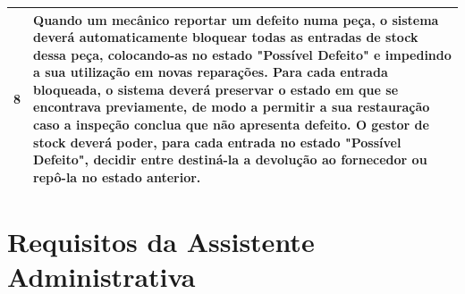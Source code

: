\documentclass[11pt,a4paper]{article}
\begin{document}
\begin{tabularx}{\textwidth}{@{}|l|X|@{}}
		\textbf{8} & Quando um mecânico reportar um defeito numa peça, o sistema deverá automaticamente bloquear todas as entradas de stock dessa peça, colocando-as no estado "Possível Defeito" e impedindo a sua utilização em novas reparações. Para cada entrada bloqueada, o sistema deverá preservar o estado em que se encontrava previamente, de modo a permitir a sua restauração caso a inspeção conclua que não apresenta defeito. O gestor de stock deverá poder, para cada entrada no estado "Possível Defeito", decidir entre destiná-la a devolução ao fornecedor ou repô-la no estado anterior. \\ \hline
	\end{tabularx}
	
	\vspace{1cm}
	
	\section*{Requisitos da Assistente Administrativa}
	
\end{document}
